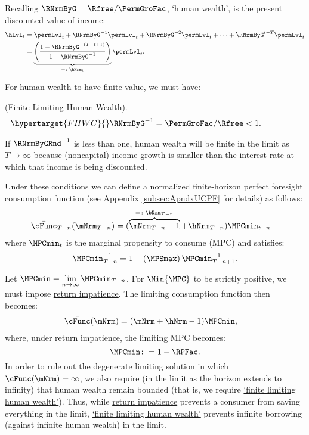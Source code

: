 \documentclass[BufferStockTheory]{subfiles}
\begin{document}
Recalling $\RNrmByG  = \Rfree/\PermGroFac$, `human wealth', is the present discounted value of income:
%
% 
\begin{align}
  \hLvl_{t}  & = \permLvl_{t}+\RNrmByG^{-1} \permLvl_{t} + \RNrmByG^{-2} \permLvl_{t} + \cdots + \RNrmByG^{t-T} \permLvl_{t} \notag
  \\  & = \underbrace{\left(\frac{1-\RNrmByG^{-(T-t+1)}}{1-\RNrmByG^{-1}}\right)}_{ = \colon \hNrm_{t}}\permLvl_{t} \label{eq:HDef}.
\end{align}

For human wealth to have finite value, we must have:
%
\begin{assumI}\label{ass:FHWC}(Finite Limiting Human Wealth).
\begin{align}\hypertarget{FHWC}{}
   \RNrmByG^{-1} = \PermGroFac/\Rfree  & < 1. \phantom{\text{{\FHWC}:~~}}\label{eq:FHWC2}
\end{align}
\end{assumI}
%
If $\RNrmByGRnd^{-1}$ is less than one, human wealth will be finite in the limit as $T \rightarrow \infty$ because (noncapital) income growth is smaller than the interest rate at which that income is being discounted.

Under these conditions we can define a normalized finite-horizon perfect foresight consumption function (see Appendix \ref{subsec:ApndxUCPF} for details) as follows:\hypertarget{MPCminDefn}{}
%
\begin{align*}
  \bar{\cFunc}_{T-n}(\mNrm_{T-n})  & = (\overbrace{\mNrm_{T-n}-1}^{
                                     = \colon  \bNrm_{T-n}}+\hNrm_{T-n})\MPCmin_{t-n}
\end{align*}
%
where $\MPCmin_{t}$ is the marginal propensity to consume (MPC) and satisfies:
%
\begin{align}\label{eq:PFMPCminInv}
\MPCmin_{T-n}^{-1}  = 1+\left(\MPSmax\right) \MPCmin_{T-n+1}^{-1}.
\end{align}
%

Let $\MPCmin = \lim\limits_{n\rightarrow\infty}\MPCmin_{T-n}$. For $\Min{\MPC}$ to be strictly positive, we must impose \hyperlink{RIC}{return impatience}.
The limiting consumption function then becomes:
%
\begin{align}\label{eq:cFuncPFUnc}
  \bar{\cFunc}(\mNrm)  & = (\mNrm+\hNrm-1)\MPCmin,
\end{align}
%
where, under return impatience, the limiting MPC becomes:
%
%
\begin{equation}\label{eq:MPCminDef}
\MPCmin \colon = 1-\RPFac.
\end{equation}
%
%
%
In order to rule out the degenerate limiting solution in which $\bar{\cFunc}(\mNrm) = \infty$, we also require (in the limit as the horizon extends to infinity) that human wealth remain bounded (that is, we require \hyperlink{FHWC}{`finite limiting human wealth'}).
Thus, while \hyperlink{RIC}{return impatience} prevents a consumer from saving everything in the limit,  \hyperlink{FHWC}{`finite limiting  human wealth'} prevents infinite borrowing (against infinite human wealth) in the limit.
\end{document}
